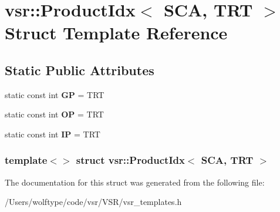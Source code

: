 \hypertarget{structvsr_1_1_product_idx_3_01_s_c_a_00_01_t_r_t_01_4}{\section{vsr\-:\-:Product\-Idx$<$ S\-C\-A, T\-R\-T $>$ Struct Template Reference}
\label{structvsr_1_1_product_idx_3_01_s_c_a_00_01_t_r_t_01_4}
}
\subsection*{Static Public Attributes}
\begin{DoxyCompactItemize}
\item 
\hypertarget{structvsr_1_1_product_idx_3_01_s_c_a_00_01_t_r_t_01_4_a9bbef2be32908ae443fe23b94e1c9d00}{static const int {\bfseries G\-P} = T\-R\-T}\label{structvsr_1_1_product_idx_3_01_s_c_a_00_01_t_r_t_01_4_a9bbef2be32908ae443fe23b94e1c9d00}

\item 
\hypertarget{structvsr_1_1_product_idx_3_01_s_c_a_00_01_t_r_t_01_4_a7fe4d34f4d526a2d5d4645ffeee31dbc}{static const int {\bfseries O\-P} = T\-R\-T}\label{structvsr_1_1_product_idx_3_01_s_c_a_00_01_t_r_t_01_4_a7fe4d34f4d526a2d5d4645ffeee31dbc}

\item 
\hypertarget{structvsr_1_1_product_idx_3_01_s_c_a_00_01_t_r_t_01_4_a898c9c4c2645a0b01bfa6f3fc8bdbd1a}{static const int {\bfseries I\-P} = T\-R\-T}\label{structvsr_1_1_product_idx_3_01_s_c_a_00_01_t_r_t_01_4_a898c9c4c2645a0b01bfa6f3fc8bdbd1a}

\end{DoxyCompactItemize}
\subsubsection*{template$<$$>$ struct vsr\-::\-Product\-Idx$<$ S\-C\-A, T\-R\-T $>$}



The documentation for this struct was generated from the following file\-:\begin{DoxyCompactItemize}
\item 
/\-Users/wolftype/code/vsr/\-V\-S\-R/vsr\-\_\-templates.\-h\end{DoxyCompactItemize}
